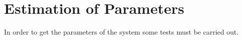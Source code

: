 \section{Estimation of Parameters}
In order to get the parameters of the system some tests must be carried out.